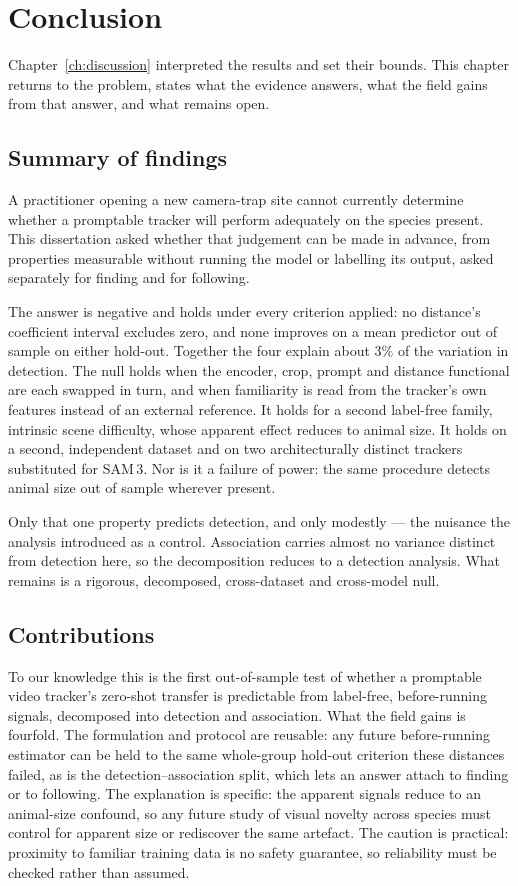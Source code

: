 \chapter{Conclusion}
\label{ch:conclusion}

Chapter~\ref{ch:discussion} interpreted the results and set their bounds. This chapter returns to the
problem, states what the evidence answers, what the field gains from that answer, and what remains open.

\section{Summary of findings}
\label{sec:concl-summary}
A practitioner opening a new camera-trap site cannot currently determine whether a promptable tracker will
perform adequately on the species present. This dissertation asked whether that judgement can be made
in advance, from properties measurable without running the model or labelling its output, asked separately
for finding and for following.

The answer is negative and holds under every criterion applied: no distance's coefficient interval excludes
zero, and none improves on a mean predictor out of sample on either hold-out. Together the four explain
about $3\%$ of the variation in detection. The null holds when the
encoder, crop, prompt and distance functional are each swapped in turn, and when familiarity is read from
the tracker's own features instead of an external reference. It holds for a second label-free
family, intrinsic scene difficulty, whose apparent effect reduces to animal size. It holds
on a second, independent dataset and on two architecturally distinct trackers substituted for SAM\,3.
Nor is it a failure of power: the same procedure detects animal size out of sample wherever present.

Only that one property predicts detection, and only modestly --- the nuisance the analysis introduced as a
control. Association carries almost no variance distinct from detection here, so the decomposition reduces
to a detection analysis. What remains is a rigorous, decomposed,
cross-dataset and cross-model null.

\section{Contributions}
\label{sec:concl-contributions}
To our knowledge this is the first out-of-sample test of whether a promptable video tracker's zero-shot
transfer is predictable from label-free, before-running signals, decomposed into detection and association.
What the field gains is fourfold. The formulation and protocol are reusable: any future before-running
estimator can be held to the same whole-group hold-out criterion these distances failed, as is the
detection--association split, which lets an answer attach to finding or to following. The
explanation is specific: the apparent signals reduce to an animal-size confound, so any future study of
visual novelty across species must control for apparent size or rediscover the same artefact. The
caution is practical: proximity to familiar training data is no safety guarantee, so reliability must be
checked rather than assumed.

